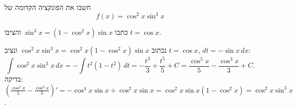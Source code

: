 
\begin{question}
חשבו את הפונקציה הקדומה של
\[ f(x)=\cos^2x\sin^3x \]
\end{question}

\begin{hint}
כתבו $\sin^3x=(1-\cos^2x)\sin x$ והציבו $t=\cos x$.
\end{hint}

\begin{solution}
נכתוב $\cos^2x\sin^3x=\cos^2x(1-\cos^2x)\sin x$ ונציב $t=\cos x$, $dt=-\sin x\,dx$:
\[ \int\cos^2x\sin^3x\,dx=-\int t^2(1-t^2)\,dt=-\frac{t^3}{3}+\frac{t^5}{5}+C=\boxed{\frac{\cos^5x}{5}-\frac{\cos^3x}{3}+C}. \]
בדיקה: $\left(\frac{\cos^5x}{5}-\frac{\cos^3x}{3}\right)'=-\cos^4x\sin x+\cos^2x\sin x=\cos^2x\sin x(1-\cos^2x)=\cos^2x\sin^3x$.
\end{solution}
